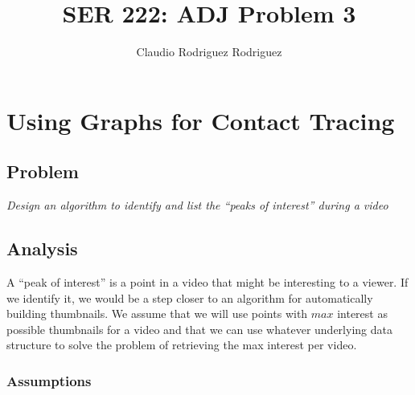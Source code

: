 \documentclass{article}
\begin{document}
\title{SER 222: ADJ Problem 3}
\author{Claudio Rodriguez Rodriguez}
\maketitle







\section{Using Graphs for Contact Tracing}

\subsection{Problem}

\textit{Design an algorithm to identify and list the ``peaks of interest'' during a video}

\subsection{Analysis}

A ``peak of interest'' is a point in a video that might be interesting to a viewer. If we identify it, we would be a step closer to an algorithm for automatically building thumbnails. We assume that we will use points with $max$ interest as possible thumbnails for a video and that we can use whatever underlying data structure to solve the problem of retrieving the max interest per video. 

\subsubsection{Assumptions}
\end{document}
